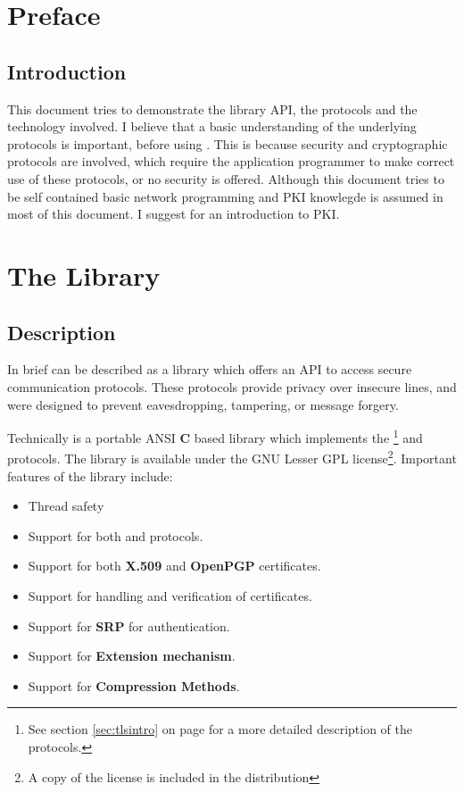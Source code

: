 \chapter{Preface}

\section{Introduction}
This document tries to demonstrate the \gnutls{} library API, the
protocols and the technology involved. I believe that a basic
understanding of the underlying protocols is important, before
using \tls{}. This is because security and cryptographic
protocols are involved, which require the application programmer
to make correct use of these protocols, or no security is
offered. Although this document tries to be self contained basic 
network programming and PKI knowlegde is assumed in most of this document. 
I suggest \cite{GUTPKI} for an introduction to PKI.

\chapter{The Library}

\section{Description}
\par
In brief \gnutls{} can be described as a library which offers
an API to access secure communication protocols. These protocols provide
privacy over insecure lines, and were designed to prevent 
eavesdropping, tampering, or message forgery.

\par
Technically \gnutls{} is a portable ANSI {\bf C} based library which implements the 
\tlsI{}\footnote{See section \ref{sec:tlsintro} on page \pageref{sec:tlsintro} for
a more detailed description of the protocols.} and \sslIII{} protocols. 
The library is available under the GNU Lesser GPL license\footnote{A copy of the license is included
in the distribution}.
Important features of the \gnutls{} library include:

\begin{itemize}
\item Thread safety
\item Support for both \tlsI{} and \sslIII{} protocols.
\item Support for both {\bf X.509} and {\bf OpenPGP} certificates.
\item Support for handling and verification of certificates.
\item Support for {\bf SRP} for \tls{} authentication.
\item Support for \tls{} {\bf Extension mechanism}.
\item Support for \tls{} {\bf Compression Methods}.
\end{itemize}

